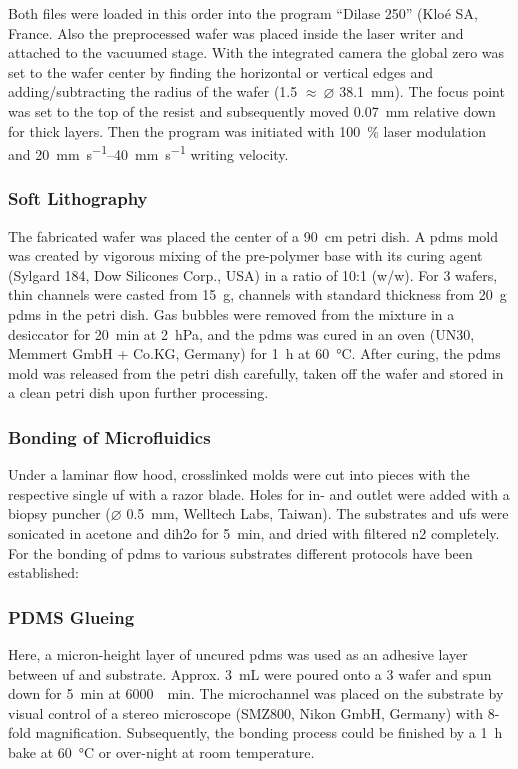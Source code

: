 Both files were loaded in this order into the program ``Dilase 250'' (Klo\'{e} SA, France. Also the preprocessed wafer was placed inside the laser writer and attached to the vacuumed stage. With the integrated camera the global zero was set to the wafer center by finding the horizontal or vertical edges and adding/subtracting the radius of the wafer (\SI{1.5}{\inch} $\approx\ \varnothing $  \SI{38.1}{\milli\meter}). The focus point was set to the top of the resist and subsequently moved \SI{.07}{\milli\meter} relative down for thick layers. Then the program was initiated with \SI{100}{\percent} laser modulation and \SIrange{20}{40}{\milli\meter\per\second} writing velocity.

\subsubsection{Soft Lithography}
The fabricated wafer was placed the center of a \SI{90}{\centi\meter} petri dish. A \gls{pdms} mold was created by vigorous mixing of the pre-polymer base with its curing agent (Sylgard 184, Dow Silicones Corp., USA) in a ratio of 10:1 (w/w). For \SI{3}{\inch} wafers, thin channels were casted from \SI{15}{\gram}, channels with standard thickness from \SI{20}{\gram} \gls{pdms} in the petri dish. Gas bubbles were removed from the mixture in a desiccator for \SI{20}{\minute} at \SI{2}{\hecto\pascal}, and the \gls{pdms} was cured in an oven (UN30, Memmert GmbH + Co.KG, Germany) for \SI{1}{\hour} at \SI{60}{\degreeCelsius}. After curing, the \gls{pdms} mold was released from the petri dish carefully, taken off the wafer and stored in a clean petri dish upon further processing.  

\subsubsection{Bonding of Microfluidics}
Under a laminar flow hood, crosslinked molds were cut into pieces with the respective single \gls{uf} with a razor blade. Holes for in- and outlet were added with a biopsy puncher ($\varnothing$ \SI{0.5}{\milli\meter}, Welltech Labs, Taiwan). The substrates and \glspl{uf} were sonicated in acetone and \gls{dih2o} for \SI{5}{\minute}, and dried with filtered \gls{n2} completely. For the bonding of \gls{pdms} to various substrates different protocols have been established:

\subsubsection{PDMS Glueing}
\label{sec:meth:bond:glue}
Here, a micron-height layer of uncured \gls{pdms} was used as an adhesive layer between \gls{uf} and substrate. Approx. \SI{3}{\milli\liter} were poured onto a \SI{3}{\inch} wafer and spun down for \SI{5}{\minute} at \SI{6000}{\per\minute}. The microchannel was placed on the substrate by visual control of a stereo microscope (SMZ800, Nikon GmbH, Germany) with 8-fold magnification. Subsequently, the bonding process could be finished by a \SI{1}{\hour} bake at \SI{60}{\degreeCelsius} or over-night at room temperature.
